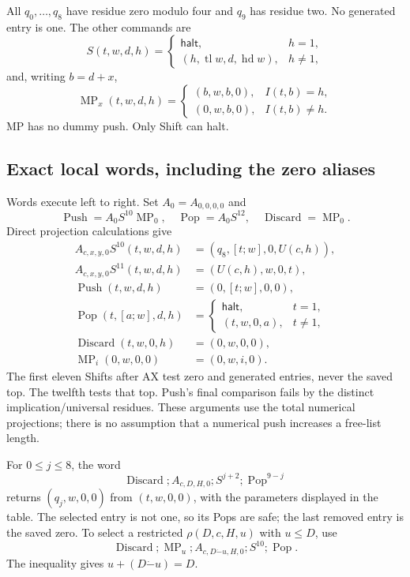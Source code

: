 All $q_0,\ldots,q_8$ have residue zero modulo four and $q_9$ has
residue two.  No generated entry is one.  The other commands are
\[
 S(t,w,d,h)=\begin{cases}\mathsf{halt},&h=1,\\
 (h,\operatorname{tl}w,d,\operatorname{hd}w),&h\ne1,
 \end{cases}
\]
and, writing $b=d+x$,
\[
 \operatorname{MP}_x(t,w,d,h)=
 \begin{cases}(b,w,b,0),&I(t,b)=h,\\(0,w,b,0),&I(t,b)\ne h.
 \end{cases}
\]
MP has no dummy push.  Only Shift can halt.

\subsection{Exact local words, including the zero aliases}

Words execute left to right.  Set $A_0=A_{0,0,0,0}$ and
\[
 \operatorname{Push}=A_0S^{10}\operatorname{MP}_0,\quad
 \operatorname{Pop}=A_0S^{12},\quad
 \operatorname{Discard}=\operatorname{MP}_0.
\]
Direct projection calculations give
\begin{align*}
 A_{c,x,y,0}S^{10}(t,w,d,h)&=(q_8,[t;w],0,U(c,h)),\\
 A_{c,x,y,0}S^{11}(t,w,d,h)&=(U(c,h),w,0,t),\\
 \operatorname{Push}(t,w,d,h)&=(0,[t;w],0,0),\\
 \operatorname{Pop}(t,[a;w],d,h)&=
   \begin{cases}\mathsf{halt},&t=1,\\(t,w,0,a),&t\ne1,
   \end{cases}\\
 \operatorname{Discard}(t,w,0,h)&=(0,w,0,0),\\
 \operatorname{MP}_i(0,w,0,0)&=(0,w,i,0).
\end{align*}
The first eleven Shifts after AX test zero and generated entries, never
the saved top.  The twelfth tests that top.  Push's final comparison
fails by the distinct implication/universal residues.  These arguments
use the total numerical projections; there is no assumption that a
numerical push increases a free-list length.

For $0\le j\le8$, the word
\[
 \operatorname{Discard};A_{c,D,H,0};S^{j+2};
                   \operatorname{Pop}^{9-j}
\]
returns $(q_j,w,0,0)$ from $(t,w,0,0)$, with the parameters displayed
in the table.  The selected entry is not one, so its Pops are safe;
the last removed entry is the saved zero.  To select a restricted
$\rho(D,c,H,u)$ with $u\le D$, use
\[
 \operatorname{Discard};\operatorname{MP}_u;
 A_{c,D\mathbin{\dot{-}}u,H,0};S^{10};\operatorname{Pop}.
\]
The inequality gives $u+(D\mathbin{\dot{-}}u)=D$.

